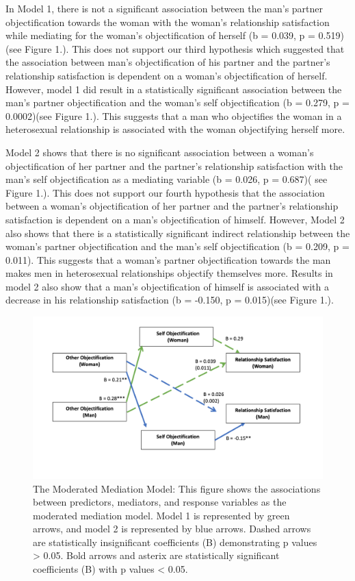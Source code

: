 \documentclass[
  english,
  man]{apa6}
\begin{document}
In Model 1, there is not a significant association between the man's partner objectification towards the woman with the woman's relationship satisfaction while mediating for the woman's objectification of herself (b = 0.039, p = 0.519)(see Figure 1.). This does not support our third hypothesis which suggested that the association between man's objectification of his partner and the partner's relationship satisfaction is dependent on a woman's objectification of herself. However, model 1 did result in a statistically significant association between the man's partner objectification and the woman's self objectification (b = 0.279, p = 0.0002)(see Figure 1.). This suggests that a man who objectifies the woman in a heterosexual relationship is associated with the woman objectifying herself more.

Model 2 shows that there is no significant association between a woman's objectification of her partner and the partner's relationship satisfaction with the man's self objectification as a mediating variable (b = 0.026, p = 0.687)( see Figure 1.). This does not support our fourth hypothesis that the association between a woman's objectification of her partner and the partner's relationship satisfaction is dependent on a man's objectification of himself. However, Model 2 also shows that there is a statistically significant indirect relationship between the woman's partner objectification and the man's self objectification (b = 0.209, p = 0.011). This suggests that a woman's partner objectification towards the man makes men in heterosexual relationships objectify themselves more. Results in model 2 also show that a man's objectification of himself is associated with a decrease in his relationship satisfaction (b = -0.150, p = 0.015)(see Figure 1.).

\begin{figure}
\centering
\includegraphics{Images/hypothesis_model_results.png}
\caption{The Moderated Mediation Model: This figure shows the associations between predictors, mediators, and response variables as the moderated mediation model. Model 1 is represented by green arrows, and model 2 is represented by blue arrows. Dashed arrows are statistically insignificant coefficients (B) demonstrating p values \textgreater{} 0.05. Bold arrows and asterix are statistically significant coefficients (B) with p values \textless{} 0.05.}
\end{figure}
\end{document}
